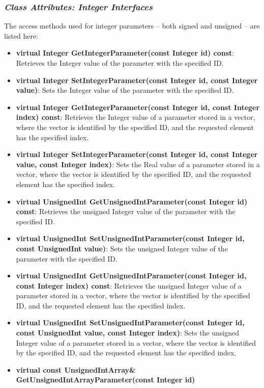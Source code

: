 \subsubsection{\textit{Class Attributes: Integer Interfaces}}

The access methods used for integer parameters -- both signed and unsigned -- are listed here:

\begin{itemize}
\item \textbf{virtual Integer GetIntegerParameter(const Integer id) const}: Retrieves the Integer
value of the parameter with the specified ID.
\item \textbf{virtual Integer SetIntegerParameter(const Integer id, const Integer value)}: Sets the
Integer value of the parameter with the specified ID.
\item \textbf{virtual Integer GetIntegerParameter(const Integer id, const Integer index) const}:
Retrieves the Integer value of a parameter stored in a vector, where the vector is identified by the
specified ID, and the requested element has the specified index.
\item \textbf{virtual Integer SetIntegerParameter(const Integer id, const Integer value, const
Integer index)}: Sets the Real value of a parameter stored in a vector, where the vector is
identified by the specified ID, and the requested element has the specified index.
\item \textbf{virtual UnsignedInt GetUnsignedIntParameter(const Integer id) const}: Retrieves the
unsigned Integer value of the parameter with the specified ID.
\item \textbf{virtual UnsignedInt SetUnsignedIntParameter(const Integer id, const UnsignedInt
value)}: Sets the unsigned Integer value of the parameter with the specified ID.
\item \textbf{virtual UnsignedInt GetUnsignedIntParameter(const Integer id, const Integer index)
const}: Retrieves the unsigned Integer value of a parameter stored in a vector, where the vector is
identified by the specified ID, and the requested element has the specified index.
\item \textbf{virtual UnsignedInt SetUnsignedIntParameter(const Integer id, const UnsignedInt
value, const Integer index)}: Sets the unsigned Integer value of a parameter stored in a vector,
where the vector is identified by the specified ID, and the requested element has the specified
index.
\item \textbf{virtual const UnsignedIntArray\& GetUnsignedIntArrayParameter(const Integer id)
}
\end{itemize}
